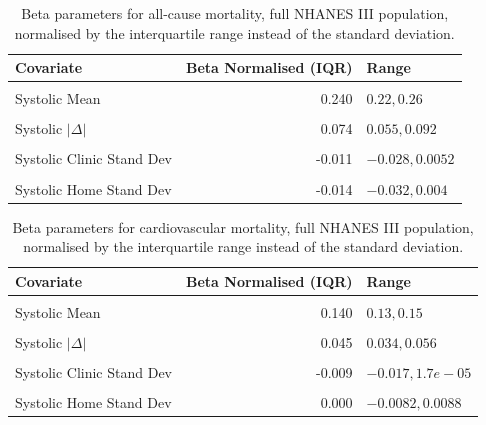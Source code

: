 \documentclass[
]{article}
\begin{document}
\begin{table}[!h]

\caption{\label{tab:iqrnormbeta}Beta parameters for all-cause mortality, full NHANES III population, normalised by the interquartile range instead of the standard deviation.}
\centering
\begin{tabular}[t]{lrl}
\toprule
Covariate & Beta Normalised (IQR) & Range\\
\midrule
\cellcolor{gray!6}{Diastolic Mean} & \cellcolor{gray!6}{-0.077} & \cellcolor{gray!6}{\(-0.097,-0.057\)}\\
Systolic Mean & 0.240 & \(0.22,0.26\)\\
\cellcolor{gray!6}{Diastolic $|\Delta|$} & \cellcolor{gray!6}{0.052} & \cellcolor{gray!6}{\(0.026,0.078\)}\\
Systolic $|\Delta|$ & 0.074 & \(0.055,0.092\)\\
\cellcolor{gray!6}{Diastolic Clinic Stand Dev} & \cellcolor{gray!6}{-0.050} & \cellcolor{gray!6}{\(-0.079,-0.022\)}\\
Systolic Clinic Stand Dev & -0.011 & \(-0.028,0.0052\)\\
\cellcolor{gray!6}{Diastolic Home Stand Dev} & \cellcolor{gray!6}{0.019} & \cellcolor{gray!6}{\(-0.0059,0.044\)}\\
Systolic Home Stand Dev & -0.014 & \(-0.032,0.004\)\\
\bottomrule
\end{tabular}
\end{table}

\begin{table}[!h]

\caption{\label{tab:iqrnormbeta}Beta parameters for cardiovascular mortality, full NHANES III population, normalised by the interquartile range instead of the standard deviation.}
\centering
\begin{tabular}[t]{lrl}
\toprule
Covariate & Beta Normalised (IQR) & Range\\
\midrule
\cellcolor{gray!6}{Diastolic Mean} & \cellcolor{gray!6}{-0.049} & \cellcolor{gray!6}{\(-0.061,-0.038\)}\\
Systolic Mean & 0.140 & \(0.13,0.15\)\\
\cellcolor{gray!6}{Diastolic $|\Delta|$} & \cellcolor{gray!6}{0.053} & \cellcolor{gray!6}{\(0.038,0.068\)}\\
Systolic $|\Delta|$ & 0.045 & \(0.034,0.056\)\\
\cellcolor{gray!6}{Diastolic Clinic Stand Dev} & \cellcolor{gray!6}{-0.019} & \cellcolor{gray!6}{\(-0.034,-0.0044\)}\\
Systolic Clinic Stand Dev & -0.009 & \(-0.017,1.7e-05\)\\
\cellcolor{gray!6}{Diastolic Home Stand Dev} & \cellcolor{gray!6}{0.012} & \cellcolor{gray!6}{\(-6e-04,0.025\)}\\
Systolic Home Stand Dev & 0.000 & \(-0.0082,0.0088\)\\
\bottomrule
\end{tabular}
\end{table}
\end{document}
